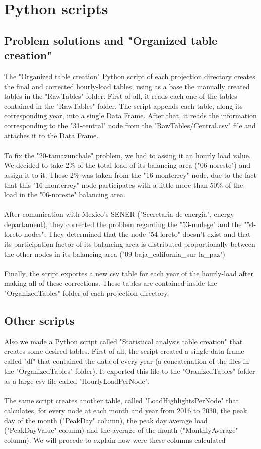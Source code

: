 \documentclass{article}
\begin{document}
\section{Python scripts}
\subsection{Problem solutions and "Organized table creation"}
The "Organized table creation" Python script of each projection directory creates the final and corrected hourly-load tables, using as a base the manually created tables in the "RawTables" folder. First of all, it reads each one of the tables contained in the "RawTables" folder. The script appends each table, along its corresponding year, into a single Data Frame. After that, it reads the information corresponding to the "31-central" node from the "RawTables/Central.csv" file and attaches it to the Data Frame.
\\
\\ To fix the "20-tamazunchale" problem, we had to assing it an hourly load value. We decided to take 2\% of the total load of its balancing area ("06-noreste") and assign it to it. These 2\% was taken from the "16-monterrey" node, due to the fact that this "16-monterrey" node participates with a little more than 50\% of the load in the "06-noreste" balancing area. 
\\
\\After comunication with Mexico's SENER ("Secretaria de energia", energy departament), they corrected the problem regarding the "53-mulege" and the "54-loreto nodes". They determined that the node "54-loreto" doesn't exist and that its participation factor of its balancing area is distributed proportionally between the other nodes in its balancing area ("09-baja\_california\_sur-la\_paz")
\\
\\Finally, the script exportes a new csv table for each year of the hourly-load after making all of these corrections. These tables are contained inside the "OrganizedTables" folder of each projection directory.
\subsection*{Other scripts}
Also we made a Python script called "Statistical analysis table creation" that creates some desired tables. First of all, the script created a single data frame called "df" that contained the data of every year (a concatenation of the files in the "OrganizedTables" folder). It exported this file to the "OranizedTables" folder as a large csv file called "HourlyLoadPerNode". 
\\
\\The same script creates another table, called "LoadHighlightsPerNode" that calculates, for every node at each month and year from 2016 to 2030, the peak day of the month ("PeakDay" column), the peak day average load ("PeakDayValue" column) and the average of the month ("MonthlyAverage" column). We will procede to explain how were these columns calculated
\end{document}
